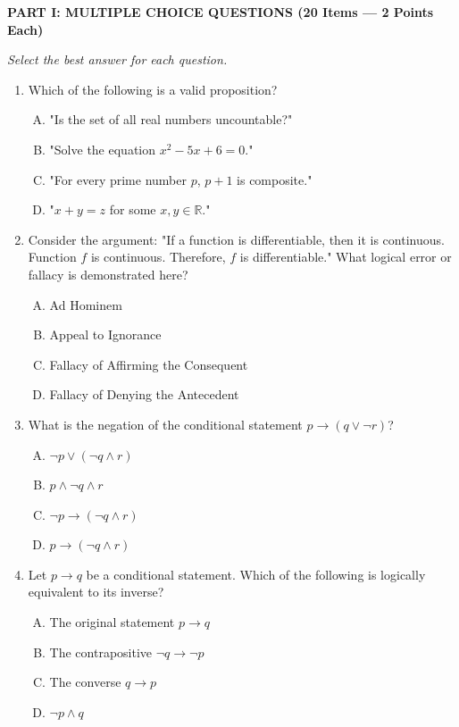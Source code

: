 \documentclass[12pt]{article}
\begin{document}
\noindent \textbf{PART I: MULTIPLE CHOICE QUESTIONS (20 Items — 2 Points Each)}
\vspace{0.5em}

\noindent \textit{Select the best answer for each question.}
    \begin{enumerate}[1.]
        \item{Which of the following is a valid proposition?}
            \begin{enumerate}[A.]
                \item{"Is the set of all real numbers uncountable?"}
                \item{"Solve the equation $x^2 - 5x + 6 = 0$."}
                \item{"For every prime number $p$, $p+1$ is composite."}
                \item{"$x + y = z$ for some $x, y \in \mathbb{R}$."}
            \end{enumerate}
            
        \item{Consider the argument: "If a function is differentiable, then it is continuous. Function $f$ is continuous. Therefore, $f$ is differentiable." What logical error or fallacy is demonstrated here?}
            \begin{enumerate}[A.]
                \item{Ad Hominem}
                \item{Appeal to Ignorance}
                \item{Fallacy of Affirming the Consequent}
                \item{Fallacy of Denying the Antecedent}
        \end{enumerate}
        
        \item{What is the negation of the conditional statement $p \to (q \vee \neg r)$?}
            \begin{enumerate}[A.]
                \item{$\neg p \vee (\neg q \wedge r)$}
                \item{$p \wedge \neg q \wedge r$}
                \item{$\neg p \to (\neg q \wedge r)$}
                \item{$p \to (\neg q \wedge r)$}
            \end{enumerate}
            
        \item{Let $p \to q$ be a conditional statement. Which of the following is logically equivalent to its inverse?}
        \begin{enumerate}[A.]
                \item{The original statement $p \to q$}
                \item{The contrapositive $\neg q \to \neg p$}
                \item{The converse $q \to p$}
                \item{$\neg p \wedge q$}
            \end{enumerate}
            

\end{enumerate}
\end{document}
